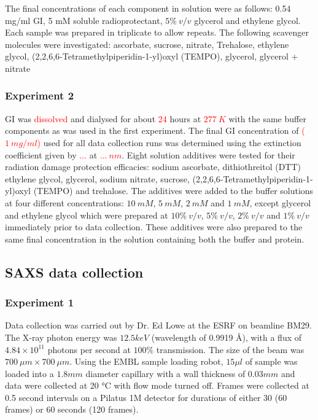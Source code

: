 The final concentrations of each component in solution were as follows:
0.54 mg/ml GI, 5 mM soluble radioprotectant, $5\%\ v/v$ glycerol and ethylene glycol.
Each sample was prepared in triplicate to allow repeats. The following scavenger molecules were investigated: ascorbate, sucrose, nitrate, Trehalose, ethylene glycol, (2,2,6,6-Tetramethylpiperidin-1-yl)oxyl (TEMPO), glycerol, glycerol + nitrate

\subsubsection{Experiment 2}
\label{subs:Experiment 2 - sample prep}
GI was \textcolor{red}{dissolved} and dialysed for about \textcolor{red}{24} hours at \textcolor{red}{$277\ K$} with the same buffer components as was used in the first experiment.
The final GI concentration of \textcolor{red}{($1\ mg/ml$)} used for all data collection runs was determined using the extinction coefficient given by \textcolor{red}{...} at \textcolor{red}{$...\ nm$}.
Eight solution additives were tested for their radiation damage protection efficacies: sodium ascorbate, dithiothreitol (DTT) ethylene glycol, glycerol, sodium nitrate, sucrose, (2,2,6,6-Tetramethylpiperidin-1-yl)oxyl (TEMPO) and trehalose.
The additives were added to the buffer solutions at four different concentrations: $10\ mM$, $5\ mM$, $2\ mM$ and $1\ mM$, except glycerol and ethylene glycol which were prepared at $10\%\ v/v$, $5\%\ v/v$, $2\%\ v/v$ and $1\%\ v/v$ immediately prior to data collection.
These additives were also prepared to the same final concentration in the solution containing both the buffer and protein.

\subsection{SAXS data collection}
\label{sub:SAXS data collection}

\subsubsection{Experiment 1}
\label{subs:Experiment 1- data col}
Data collection was carried out by Dr. Ed Lowe at the ESRF on beamline BM29.
The X-ray photon energy was $12.5 keV$ (wavelength of 0.9919 \AA), with a flux of $4.84 \times 10^{11}$ photons per second at $100\%$ transmission.
The size of the beam was $700\ \mu m \times 700\ \mu m$.
Using the EMBL sample loading robot, $15 \mu l$ of sample was loaded into a $1.8 mm$ diameter capillary with a wall thickness of $0.03 mm$ and data were collected at 20 °C with flow mode turned off.
Frames were collected at 0.5 second intervals on a Pilatus 1M detector for durations of either 30 (60 frames) or 60 seconds (120  frames).

